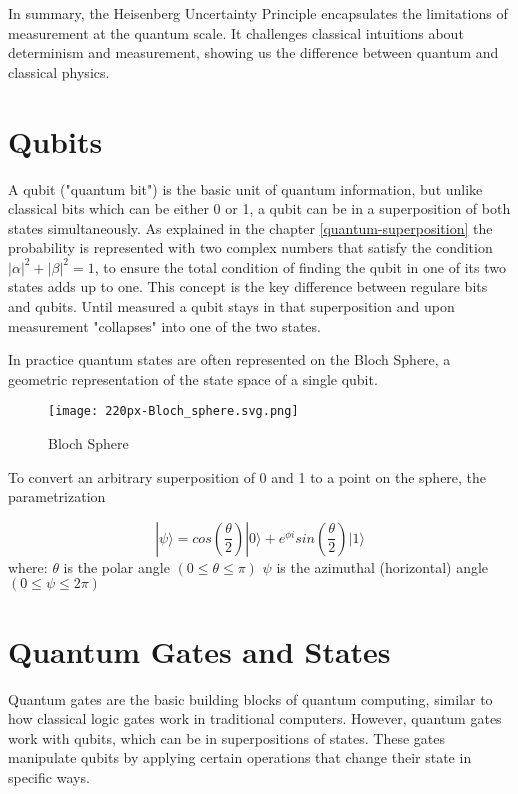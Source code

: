 \documentclass{report}
\begin{document}
In summary, the Heisenberg Uncertainty Principle encapsulates the limitations of measurement at the quantum scale. It challenges classical intuitions about determinism and measurement, showing us the difference between quantum and classical physics.

\cite{caltechWhatUncertainty}
\cite{britannicaUncertaintyPrinciple}
\cite{heisenbergyt}

\section{Qubits}
A qubit ("quantum bit")  is the basic unit of quantum information, but unlike classical bits which can be either 0 or 1, a qubit can be in a superposition of both states simultaneously. As explained in the chapter \ref{quantum-superposition}  the probability is represented with two complex numbers that satisfy the condition \(
    \lvert \alpha \rvert^{2} +\lvert \beta \rvert^{2} = 1
    \label{eq:custom_eq} \), to ensure the total condition of finding the qubit in one of its two states adds up to one.
This concept is the key difference between regulare bits and qubits. Until measured a qubit stays in that superposition and upon measurement "collapses" into one of the two states.

In practice quantum states are often represented on the Bloch Sphere, a geometric representation of the state space of a single qubit.
\begin{figure}
    \centering
    \texttt{[image: 220px-Bloch\_sphere.svg.png]}
    \caption{Bloch Sphere}
    \label{fig:bloch-sphere}
\end{figure}
To convert an arbitrary superposition of 0 and 1 to a point on the sphere, the parametrization 

\[
    |\psi \rangle = cos(\frac{\theta}{2})|0 \rangle + e^{\phi i}sin(\frac{\theta}{2})|1⟩
\]
where:
\(\theta\) is the polar angle \((0 \leq \theta \leq \pi)\)
\(\psi\) is the azimuthal (horizontal) angle \((0 \leq \psi \leq 2\pi)\)

\cite{geeksforgeeksQubitRepresentation}
\cite{stackexchangeUnderstandingBloch}
\cite{cam}
\cite{microsoftWhatQubit}

\section{Quantum Gates and States}
Quantum gates are the basic building blocks of quantum computing, similar to how classical logic gates work in traditional computers. However, quantum gates work with qubits, which can be in superpositions of states. These gates manipulate qubits by applying certain operations that change their state in specific ways.
\end{document}

